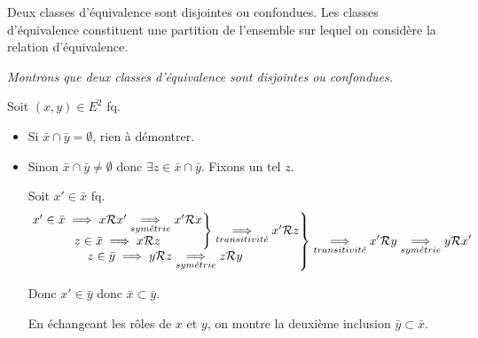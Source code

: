 \documentclass{article}
\date{29 novembre 2023}
\begin{document}
\maketitle

\begin{question_kholle}
	[\noindent Soit \Rel une relation d'équivalence sur $E$. \\
		Soit $x \in E$. \\
		La classe de $x$, notée $\bar{x}$, est l'ensemble des éléments de $E$ en relation avec x.
		\begin{equation}
			\bar{x} = \left\{ y \in E \;|\; x \Rel y \right\}
		\end{equation}]
	{Deux classes d'équivalence sont disjointes ou confondues. Les classes d'équivalence constituent une partition de l'ensemble sur lequel on considère la relation d'équivalence.}

	\textit{Montrons que deux classes d'équivalence sont disjointes ou confondues.}

	Soit $(x, y) \in E^2$ fq.
	\begin{itemize}[label=\textemdash]
		\item Si $\bar{x} \cap \bar{y} = \emptyset$, rien à démontrer.
		\item Sinon $\bar{x} \cap \bar{y} \neq \emptyset$ donc $\exists z \in \bar{x} \cap \bar{y}$. Fixons un tel $z$.

		      Soit $x' \in \bar{x}$ fq.
		      \begin{equation*}
			      \left.
			      \begin{matrix}
				      \left. \begin{matrix}
					             x' \in \bar{x} \implies x \mathcal R x' \underset{sym\acute{e}trie}{\implies} x' \mathcal R x \\
					             z \in \bar{x} \implies x \mathcal R z
				             \end{matrix}
				      \right\} \underset{transitivit\acute{e}}{\implies} x' \mathcal R z \\
				      z \in \bar{y} \implies y \mathcal R z \underset{sym\acute{e}trie}{\implies} z \mathcal R y
			      \end{matrix}
			      \right\} \underset{transitivit\acute{e}}{\implies} x' \mathcal R y
			      \underset{sym\acute{e}trie}{\implies} y \mathcal R x'
		      \end{equation*}

		      Donc $x' \in \bar{y}$ donc $\bar{x} \subset \bar{y}$.

		      En échangeant les rôles de $x$ et $y$, on montre la deuxième inclusion $\bar{y} \subset \bar{x}$.
	\end{itemize}
	\bigbreak


\end{question_kholle}
\end{document}
